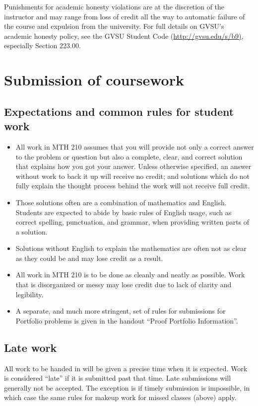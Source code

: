 \documentclass[11pt]{article}
\begin{document}
Punishments for academic honesty violations are at the discretion of the instructor and may range from loss of credit all the way to automatic failure of the course and expulsion from the university. For full details on GVSU's academic honesty policy, see the GVSU Student Code (\url{http://gvsu.edu/s/b9)}, especially Section 223.00.


\section{Submission of coursework}

\subsection{Expectations and common rules for student work}

\begin{itemize}[itemsep=0pt]
	\item All work in MTH 210 assumes that you will provide not only a correct answer to the problem or question but also a complete, clear, and correct solution that explains how you got your answer. Unless otherwise specified, an answer without work to back it up will receive no credit; and solutions which do not fully explain the thought process behind the work will not receive full credit. 
	\item Those solutions often are a combination of mathematics and English. Students are expected to abide by basic rules of English usage, such as correct spelling, punctuation, and grammar, when providing written parts of a solution. 
	\item Solutions without English to explain the mathematics are often not as clear as they could be and may lose credit as a result. 
	\item All work in MTH 210 is to be done as cleanly and neatly as possible. Work that is disorganized or messy may lose credit due to lack of clarity and legibility. 
	\item A separate, and much more stringent, set of rules for submissions for Portfolio problems is given in the handout ``Proof Portfolio Information''. 
\end{itemize}

\subsection{Late work}

All work to be handed in will be given a precise time when it is expected. Work is considered ``late'' if it is submitted past that time. Late submissions will generally not be accepted. The exception is if timely submission is impossible, in which case the same rules for makeup work for missed classes (above) apply. 
\end{document}
